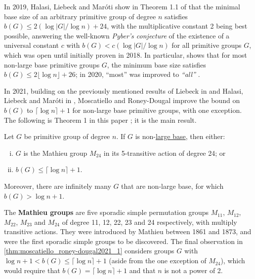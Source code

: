 In 2019, Halasi, Liebeck and Mar\'oti show in Theorem 1.1 of \cite{halasi2019} that the minimal base size of an arbitrary primitive group of degree $n$ satisfies $b(G) \leq 2(\log|G|/\log n) + 24$, with the multiplicative constant 2 being best possible, answering the well-known \textit{Pyber's conjecture} of the existence of a universal constant $c$ with $b(G) < c(\log|G|/\log n)$ for all primitive groups $G$, which was open until initially proven in 2018. In particular, \cite{halasi2019} shows that for most non-large base primitive groups $G$, the minimum base size satisfies $b(G) \leq 2\lfloor\log n\rfloor + 26$; in 2020, ``most'' was improved to \textit{``all''} \cite{moscatiello_roney-dougal2021}.

In 2021, building on the previously mentioned results of Liebeck in \cite{liebeck1984} and Halasi, Liebeck and Mar\'oti in \cite{halasi2019}, Moscatiello and Roney-Dougal improve the bound on $b(G)$ to $\lceil\log n\rceil + 1$ for non-large base primitive groups, with one exception. The following is Theorem 1 in this paper \cite{moscatiello_roney-dougal2021}; it is the main result.

\begin{theorem}\label{thm:moscatiello_roney-dougal2021_1}
    Let $G$ be primitive group of degree $n$. If $G$ is non-\hyperref[def:large_base]{large base}, then either:
    \begin{enumerate}[(i)]
        \item $G$ is the Mathieu group $M_{24}$ in its 5-transitive action of degree 24; or
        \item $b(G) \leq \lceil\log n\rceil + 1$.
    \end{enumerate}
    Moreover, there are infinitely many $G$ that are non-large base, for which $b(G) > \log n + 1$.
\end{theorem}

The \textbf{Mathieu groups} are five sporadic simple permutation groups $M_{11}$, $M_{12}$, $M_{22}$, $M_{23}$ and $M_{24}$ of degree 11, 12, 22, 23 and 24 respectively, with multiply transitive actions. They were introduced by Mathieu between 1861 and 1873, and were the first sporadic simple groups to be discovered. The final observation in \autoref{thm:moscatiello_roney-dougal2021_1} considers groups $G$ with $\log n + 1 < b(G) \leq \lceil\log n\rceil + 1$ (aside from the one exception of $M_{24}$), which would require that $b(G) = \lceil\log n\rceil + 1$ and that $n$ is not a power of 2.

